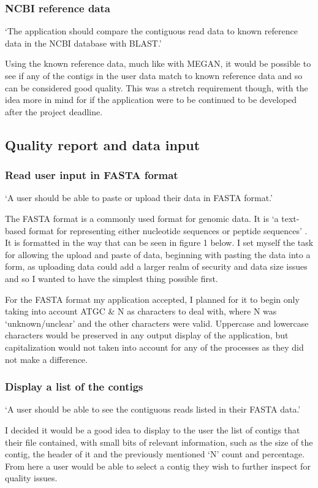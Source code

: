\subsubsection{NCBI reference data}
`The application should compare the contiguous read data to known reference data in the NCBI database with BLAST.'

Using the known reference data, much like with MEGAN, it would be possible to see if any of the contigs in the user data match to known reference data and so can be considered good quality. This was a stretch requirement though, with the idea more in mind for if the application were to be continued to be developed after the project deadline.

\subsection{Quality report and data input}
\subsubsection{Read user input in FASTA format}
`A user should be able to paste or upload their data in FASTA format.'

The FASTA format is a commonly used format for genomic data. It is `a text-based format for representing either nucleotide sequences or peptide sequences' \cite{fastaformat}. It is formatted in the way that can be seen in figure 1 below. I set myself the task for allowing the upload and paste of data, beginning with pasting the data into a form, as uploading data could add a larger realm of security and data size issues and so I wanted to have the simplest thing possible first.

For the FASTA format my application accepted, I planned for it to begin only taking into account ATGC \& N as characters to deal with, where N was `unknown/unclear' and the other characters were valid. Uppercase and lowercase characters would be preserved in any output display of the application, but capitalization would not taken into account for any of the processes as they did not make a difference.

\subsubsection{Display a list of the contigs}
`A user should be able to see the contiguous reads listed in their FASTA data.'

I decided it would be a good idea to display to the user the list of contigs that their file contained, with small bits of relevant information, such as the size of the contig, the header of it and the previously mentioned `N' count and percentage. From here a user would be able to select a contig they wish to further inspect for quality issues.


